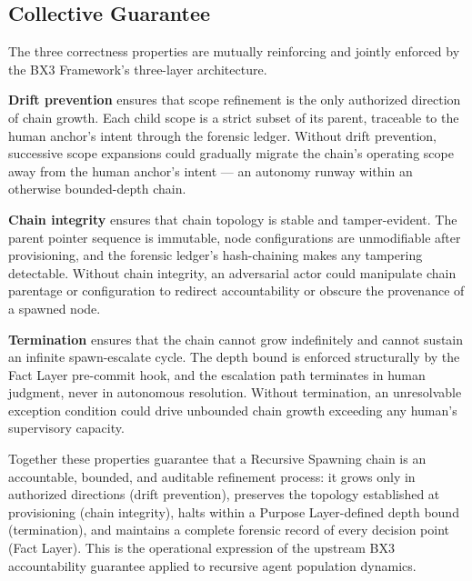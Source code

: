 \subsection{Collective Guarantee}
\label{sec:rs-collective-guarantee}

The three correctness properties are mutually reinforcing and jointly enforced by the BX3 Framework's three-layer architecture.

\medskip
\textbf{Drift prevention} ensures that scope refinement is the only authorized direction of chain growth. Each child scope is a strict subset of its parent, traceable to the human anchor's intent through the forensic ledger. Without drift prevention, successive scope expansions could gradually migrate the chain's operating scope away from the human anchor's intent --- an autonomy runway within an otherwise bounded-depth chain.

\medskip
\textbf{Chain integrity} ensures that chain topology is stable and tamper-evident. The parent pointer sequence is immutable, node configurations are unmodifiable after provisioning, and the forensic ledger's hash-chaining makes any tampering detectable. Without chain integrity, an adversarial actor could manipulate chain parentage or configuration to redirect accountability or obscure the provenance of a spawned node.

\medskip
\textbf{Termination} ensures that the chain cannot grow indefinitely and cannot sustain an infinite spawn-escalate cycle. The depth bound is enforced structurally by the Fact Layer pre-commit hook, and the escalation path terminates in human judgment, never in autonomous resolution. Without termination, an unresolvable exception condition could drive unbounded chain growth exceeding any human's supervisory capacity.

Together these properties guarantee that a Recursive Spawning chain is an accountable, bounded, and auditable refinement process: it grows only in authorized directions (drift prevention), preserves the topology established at provisioning (chain integrity), halts within a Purpose Layer-defined depth bound (termination), and maintains a complete forensic record of every decision point (Fact Layer). This is the operational expression of the upstream BX3 accountability guarantee applied to recursive agent population dynamics.
